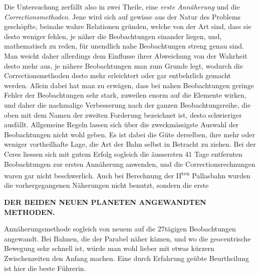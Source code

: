 Die Untersuchung zerfällt also in zwei Theile, eine \emph{erste Annäherung} und die \emph{Correctionsmethoden}. Jene wird sich auf gewisse aus der Natur des Problems geschöpfte, beinahe wahre Relationen gründen, welche von der Art sind, dass sie desto weniger fehlen, je näher die Beobachtungen einander liegen, und, mathematisch zu reden, für unendlich nahe Beobachtungen streng genau sind. Man weicht daher allerdings dem Einflusse ihrer Abweichung von der Wahrheit desto mehr aus, je nähere Beobachtungen man zum Grunde legt, wodurch die Correctionsmethoden desto mehr erleichtert oder gar entbehrlich gemacht werden. Allein dabei hat man zu erwägen, dass bei nahen Beobachtungen geringe Fehler der Beobachtungen sehr stark, zuweilen enorm auf die Elemente wirken, und daher die nachmalige Verbesserung nach der ganzen Beobachtungsreihe, die oben mit dem Namen der zweiten Forderung bezeichnet ist, desto schwieriger ausfällt. Allgemeine Regeln lassen sich über die zweckmässigste Auswahl der Beobachtungen nicht wohl geben. Es ist dabei die Güte derselben, ihre mehr oder weniger vortheilhafte Lage, die Art der Bahn selbst in Betracht zu ziehen. Bei der Ceres liessen sich mit gutem Erfolg sogleich die äussersten 41 Tage entfernten Beobachtungen zur ersten Annäherung anwenden, und die Correctionsrechnungen waren gar nicht beschwerlich. Auch bei Berechnung der II\textsuperscript{ten} Pallasbahn wurden die vorhergegangenen Näherungen nicht benutzt, sondern die erste
\par\clearpage
\thispagestyle{empty}
\noindent{}%
\makebox[12mm][l]{}%
\parbox[t]{\dimexpr\linewidth-24mm\relax}{\centering\fontsize{7.4}{9.2}\selectfont\bfseries DER BEIDEN NEUEN PLANETEN ANGEWANDTEN METHODEN.\par}%
\par\nobreak\smallskip
\noindent Annäherungsmethode sogleich von neuem auf die 27tägigen Beobachtungen angewandt. Bei Bahnen, die der Parabel näher kämen, und wo die geocentrische Bewegung sehr schnell ist, würde man wohl lieber mit etwas kürzern Zwischenzeiten den Anfang machen. Eine durch Erfahrung geübte Beurtheilung ist hier die beste Führerin.

